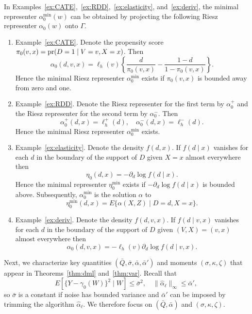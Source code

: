 \begin{lemma}\label{lemma:RR_exists}
In Examples~\ref{ex:CATE},~\ref{ex:RDD},~\ref{ex:elasticity}, and~\ref{ex:deriv}, the minimal representer $\alpha_0^{\min}(w)$ can be obtained by projecting the following Riesz representer $\alpha_0(w)$ onto $\Gamma$.
\begin{enumerate}
    \item Example~\ref{ex:CATE}. Denote the propensity score $\pi_0(v,x)=\text{\normalfont pr}(D=1\mid V=v,X=x)$. Then
    $$
    \alpha_0(d,v,x)=\ell_h(v)\left\{\frac{d}{\pi_0(v,x)}-\frac{1-d}{1-\pi_0(v,x)}\right\}.
    $$
    Hence the minimal Riesz representer $\alpha^{\min}_0$ exists if $\pi_0(v,x)$ is bounded away from zero and one.
    \item Example~\ref{ex:RDD}. Denote the Riesz representer for the first term by $\alpha_0^{+}$ and the Riesz representer for the second term by $\alpha_0^{-}$. Then
    $$
    \alpha^+_0(d,x)=\ell_h^{+}(d),
    \quad 
     \alpha^-_0(d,x)=\ell_h^{-}(d).
    $$
    Hence the minimal Riesz representer $\alpha^{\min}_0$ exists.
    \item Example~\ref{ex:elasticity}. Denote the density $f(d,x)$. If $f(d\mid x)$ vanishes for each $d$ in the boundary of the support of $D$ given $X=x$ almost everywhere then
    $$
    \eta_0(d,x)
    =-\partial_d \log f(d \mid x).$$ Hence the minimal representer $\eta_0^{\min}$ exists if $-\partial_d \log f(d \mid x)$ is bounded above. Subsequently, $\alpha_0^{\min}$ is the solution $\alpha$ to
    $$
    \eta_0^{\min}(d,x)=E\{\alpha(X,Z) \mid D=d,X=x\}.
    $$
    \item Example~\ref{ex:deriv}. Denote the density $f(d,v,x)$. If $f(d\mid v,x)$ vanishes for each $d$ in the boundary of the support of $D$ given $(V,X)=(v,x)$ almost everywhere then
    $$
    \alpha_0(d,v,x)
    =-\ell_h(v)\partial_d \log f(d \mid v,x).$$
\end{enumerate}
\end{lemma}


Next, we characterize key quantities $(\bar{Q},\bar{\sigma},\bar{\alpha},\bar{\alpha}')$ and moments $(\sigma,\kappa,\zeta)$ that appear in Theorems~\ref{thm:dml} and~\ref{thm:var}. Recall that
$$
E[\{Y-\gamma_0(W)\}^2 \mid W]\leq \bar{\sigma}^2, \quad  \|\hat{\alpha}_{\ell}\|_{\infty}\leq\bar{\alpha}',
$$
so $\bar{\sigma}$ is a constant if noise has bounded variance and $\bar{\alpha}'$ can be imposed by trimming the algorithm $\hat{\alpha}_{\ell}$. We therefore focus on $(\bar{Q},\bar{\alpha})$ and $(\sigma,\kappa,\zeta)$.

